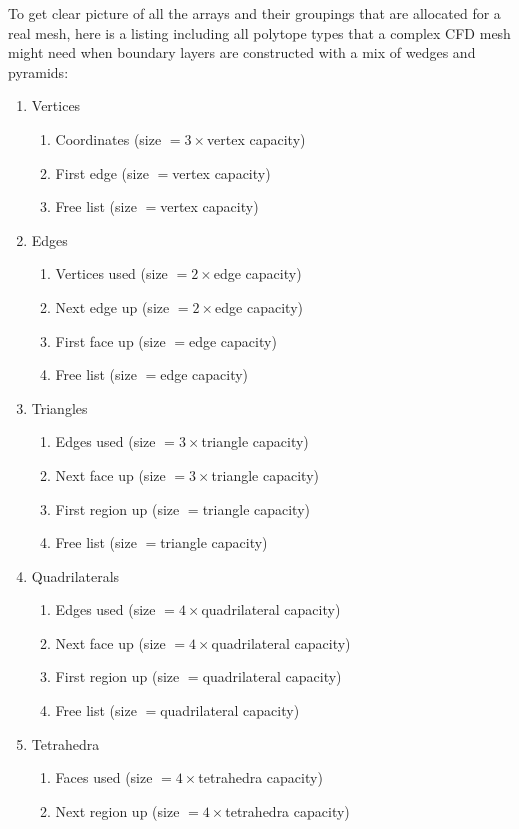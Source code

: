 To get clear picture of all the arrays and their groupings
that are allocated for a real mesh, here is a listing
including all polytope types that a complex CFD mesh
might need when boundary layers are constructed with
a mix of wedges and pyramids:
\begin{enumerate}
\item Vertices
  \begin{enumerate}
  \item Coordinates (size $=3\times$vertex capacity)
  \item First edge (size $=$vertex capacity)
  \item Free list (size $=$vertex capacity)
  \end{enumerate}
\item Edges
  \begin{enumerate}
  \item Vertices used (size $=2\times$edge capacity)
  \item Next edge up (size $=2\times$edge capacity)
  \item First face up (size $=$edge capacity)
  \item Free list (size $=$edge capacity)
  \end{enumerate}
\item Triangles
  \begin{enumerate}
  \item Edges used (size $=3\times$triangle capacity)
  \item Next face up (size $=3\times$triangle capacity)
  \item First region up (size $=$triangle capacity)
  \item Free list (size $=$triangle capacity)
  \end{enumerate}
\item Quadrilaterals
  \begin{enumerate}
  \item Edges used (size $=4\times$quadrilateral capacity)
  \item Next face up (size $=4\times$quadrilateral capacity)
  \item First region up (size $=$quadrilateral capacity)
  \item Free list (size $=$quadrilateral capacity)
  \end{enumerate}
\item Tetrahedra
  \begin{enumerate}
  \item Faces used (size $=4\times$tetrahedra capacity)
  \item Next region up (size $=4\times$tetrahedra capacity)

\end{enumerate}
\end{enumerate}
